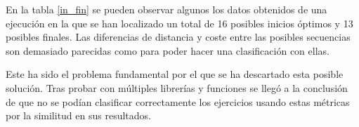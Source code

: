 \begin{table}[H]
\centering
{}
\caption{Análisis de los datos obtenidos con inicios y finales.}
\label{in_fin}
\end{table}

En la tabla \ref{in_fin} se pueden observar algunos los datos obtenidos de una ejecución en la que se han localizado un total de 16 posibles inicios óptimos y 13 posibles finales. Las diferencias de distancia y coste entre las posibles secuencias son demasiado parecidas como para poder hacer una clasificación con ellas. 

Este ha sido el problema fundamental por el que se ha descartado esta posible solución. Tras probar con múltiples librerías y funciones se llegó a la conclusión de que no se podían clasificar correctamente los ejercicios usando estas métricas por la similitud en sus resultados. 


